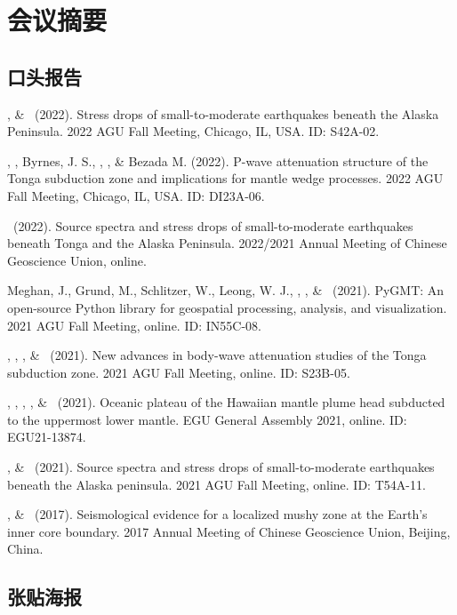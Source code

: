 \section{会议摘要}

\subsection{口头报告}

\begin{etaremune}
\item
    \SWei, \& \Me\ (2022).
    Stress drops of small-to-moderate earthquakes beneath the Alaska Peninsula.
    2022 AGU Fall Meeting, Chicago, IL, USA. ID: S42A-02.
\item
    \YZhang, \SWei, Byrnes, J. S., \Me, \FWang, \& Bezada M. (2022).
    P-wave attenuation structure of the Tonga subduction zone and implications for mantle wedge processes.
    2022 AGU Fall Meeting, Chicago, IL, USA. ID: DI23A-06.
\item
    \Me\ (2022).
    Source spectra and stress drops of small-to-moderate earthquakes beneath Tonga and the Alaska Peninsula.
    2022/2021 Annual Meeting of Chinese Geoscience Union, online.
\item
    Meghan, J., Grund, M., Schlitzer, W., Leong, W. J., \Me, \JYao, \& \LUieda\ (2021).
    PyGMT: An open-source Python library for geospatial processing, analysis, and visualization.
    2021 AGU Fall Meeting, online. ID: IN55C-08.
\item
    \SWei, \YZhang, \Me, \& \DWiens\ (2021).
    New advances in body-wave attenuation studies of the Tonga subduction zone.
    2021 AGU Fall Meeting, online. ID: S23B-05.
\item
    \SWei, \PShearer, \CLithgowBertelloni, \LStixrude, \& \Me\ (2021).
    Oceanic plateau of the Hawaiian mantle plume head subducted to the uppermost lower mantle.
    EGU General Assembly 2021, online. ID: EGU21-13874.
\item
    \Me, \& \SWei\ (2021).
    Source spectra and stress drops of small-to-moderate earthquakes beneath the Alaska peninsula.
    2021 AGU Fall Meeting, online. ID: T54A-11.
\item
    \Me, \& \LWen\ (2017).
    Seismological evidence for a localized mushy zone at the Earth's inner core boundary.
    2017 Annual Meeting of Chinese Geoscience Union, Beijing, China.
\end{etaremune}

\subsection{张贴海报}

